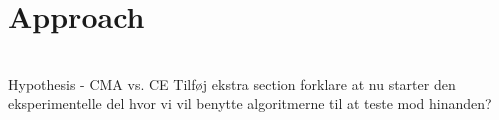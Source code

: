\section{Approach}

\\
Hypothesis - CMA vs. CE
Tilføj ekstra section forklare at nu starter 
den eksperimentelle del hvor vi vil 
benytte algoritmerne til at teste mod hinanden?

